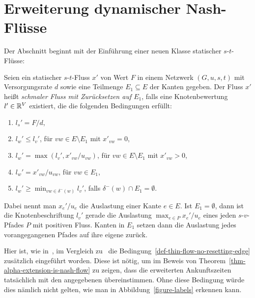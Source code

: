 \section{Erweiterung dynamischer Nash-Flüsse}\label{sec-thin-flows}

Der Abschnitt beginnt mit der Einführung einer neuen Klasse statischer $s$-$t$-Flüsse:

\begin{definition}\label{def-thin-flow}
	Seien ein statischer $s$-$t$-Fluss $x'$ von Wert $F$ in einem Netzwerk $(G, u, s, t)$ mit Versorgungsrate $d$ sowie eine Teilmenge $E_1\subseteq E$ der Kanten gegeben.
	Der Fluss $x'$ heißt \emph{schmaler Fluss mit Zurücksetzen auf $E_1$}, falls eine Knotenbewertung $l'\in\mathbb{R}^V$ existiert, die die folgenden Bedingungen erfüllt:
	\begin{enumerate}[label=(T\arabic*)]
	\item\label{def-thin-flow-source} $l_s' = F/d$,
	\item\label{def-thin-flow-x-zero} $l_w' \leq l_v'$, \tabto{4cm} für $vw\in E \setminus E_1$ mit $x'_{vw}=0$,
	\item\label{def-thin-flow-x-positive} $l_w' = \max(l_v', x'_{vw} / u_{vw} )$,  \tabto{4cm} für $vw\in E\setminus E_1$ mit $x'_{vw} > 0$,
	\item\label{def-thin-flow-resetting-edge} $l_w' = x'_{vw} / u_{vw}$,  \tabto{4cm} für $vw\in E_1$,
	\item\label{def-thin-flow-no-resetting-edge} $l_w' \geq \min_{vw\in \delta^-(w)} l_v'$, \tabto{4cm} falls $\delta^-(w)\cap E_1 = \emptyset$.
	\end{enumerate}
\end{definition}

Dabei nennt man $x_e'/u_e$ die Auslastung einer Kante $e\in E$.
Ist $E_1 = \emptyset$, dann ist die Knotenbeschriftung $l_v'$ gerade die Auslastung $\max_{e\in P} x_e'/u_e$ eines jeden $s$-$v$-Pfades $P$ mit positiven Fluss.
Kanten in $E_1$ setzen dann die Auslastung jedes vorangegangenen Pfades auf ihre eigene zurück.

\begin{remark}\label{remark-thin-flow}
	Hier ist, wie in~\cite[Definition~4]{Cominetti2011}, im Vergleich zu~\cite[Definition~6]{Koch2011} die Bedingung~\ref{def-thin-flow-no-resetting-edge} zusätzlich eingeführt worden.
	Diese ist nötig, um im Beweis von Theorem~\ref{thm-alpha-extension-is-nash-flow} zu zeigen, dass die erweiterten Ankunftszeiten tatsächlich mit den angegebenen übereinstimmen.
	Ohne diese Bedingung würde dies nämlich nicht gelten, wie man in Abbildung~\ref{figure-labels} erkennen kann.
\end{remark}

